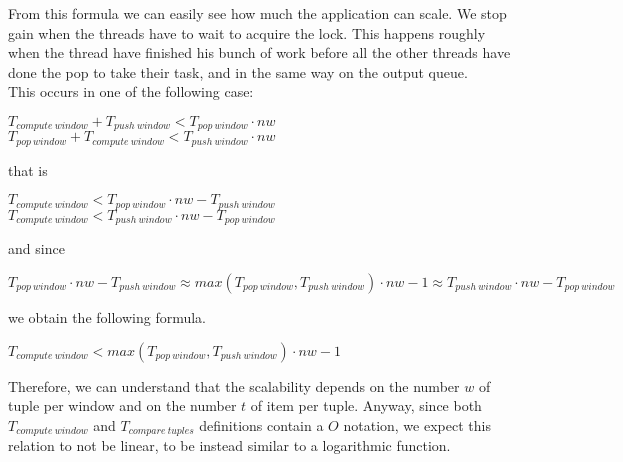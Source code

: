 \noindent
From  this formula we can easily see how much the application can scale. We stop gain when the threads have to wait to acquire the lock. This happens roughly when the thread have finished his bunch of work before all the other threads have done the pop to take their task, and in the same way on the output queue.\\
This occurs in one of the following case:
\begin{center}
    $T_{compute\ window} + T_{push\ window} < T_{pop\ window} \cdot nw$ \\
    $T_{pop\ window} + T_{compute\ window} < T_{push\ window} \cdot nw$
\end{center}
that is
\begin{center}
    $T_{compute\ window} < T_{pop\ window} \cdot nw - T_{push\ window}$ \\
    $T_{compute\ window} < T_{push\ window} \cdot nw - T_{pop\ window}$
\end{center}
and since
\begin{center}
    $T_{pop\ window} \cdot nw - T_{push\ window} \approx max(T_{pop\ window}, T_{push\ window}) \cdot nw - 1 \approx T_{push\ window} \cdot nw - T_{pop\ window}$
\end{center}
we obtain the following formula.
\begin{center}
    $T_{compute\ window} < max(T_{pop\ window}, T_{push\ window}) \cdot nw - 1$
\end{center}

\bigskip\noindent
Therefore, we can understand that the scalability depends on the number $w$ of tuple per window and on the number $t$ of item per tuple. Anyway, since both $T_{compute\ window}$ and $T_{compare\ tuples}$ definitions contain a $O$ notation, we expect this relation to not be linear, to be instead similar to a logarithmic function.